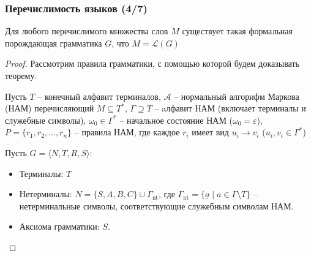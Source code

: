 \begin{frame}
    \frametitle{Перечислимость языков (4/7)}

    \begin{theorem}
        Для любого перечислимого множества слов $M$ существует такая формальная порождающая грамматика $G$, что $M = \mathcal{L}(G)$
    \end{theorem}
    \begin{proof}
        Рассмотрим правила грамматики, с помощью которой будем доказывать теорему.

        Пусть $T$ -- конечный алфавит терминалов, $\mathcal{A}$ -- нормальный алгорифм Маркова (НАМ) перечисляющий $M \subseteq T^*$, $ \Gamma \supseteq T $ -- aлфавит НАМ (включает терминалы и служебные символы), $ \omega_0 \in \Gamma^* $ -- начальное состояние НАМ ($\omega_0 = \varepsilon$), $ P = \{ r_1, r_2, \dots, r_n \} $ -- правила НАМ, где каждое $ r_i $ имеет вид $ u_i \to v_i $ ($ u_i, v_i \in \Gamma^* $)


        Пусть $ G = \langle N, T, R, S \rangle$:
        \begin{itemize}
            \item Терминалы: $ T $
            \item Нетерминалы: $ N = \{ S, A, B, C \} \cup \Gamma_{\text{nt}}$, где $ \Gamma_{\text{nt}} = \{ \underline{a} \mid a \in \Gamma \setminus T \} $ -- нетерминальные символы, соответствующие служебным символам НАМ.
            \item Аксиома грамматики: $ S $.
        \end{itemize}

    \end{proof}
\end{frame}
